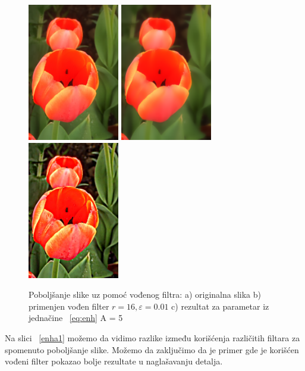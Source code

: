 \documentclass[a4paper,12pt,titlepage]{article}
\begin{document}
\begin{figure}[ht!]
\centering
\includegraphics[width=40mm]{img/flower.png}
\includegraphics[width=40mm]{img/flowerEGF.png}
\includegraphics[width=40mm]{img/flowerER.png}
\caption{Poboljšanje slike uz pomoć vođenog filtra: a) originalna slika b) primenjen vođen filter $r = 16, \varepsilon = 0.01$ c) rezultat za parametar iz jednačine ~\ref{eq:enh} A = 5 }
\label{enha}
\end{figure}

Na slici ~\ref{enha1} možemo da vidimo razlike između korišćenja različitih filtara za spomenuto poboljšanje slike. Možemo da zaključimo da je primer gde je korišćen vođeni filter pokazao bolje rezultate u naglašavanju detalja.
\end{document}
